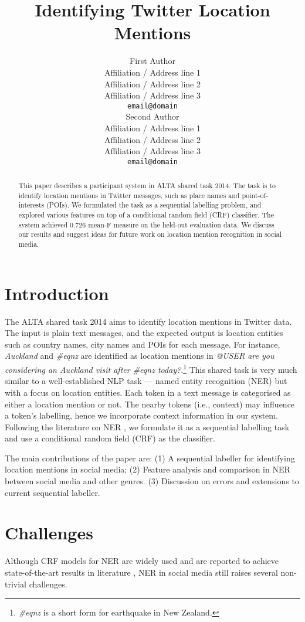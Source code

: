 \documentclass[11pt]{article}
\title{Identifying Twitter Location Mentions}
\author{First Author \\
  Affiliation / Address line 1 \\
  Affiliation / Address line 2 \\
  Affiliation / Address line 3 \\
  {\tt email@domain} \\\And
  Second Author \\
  Affiliation / Address line 1 \\
  Affiliation / Address line 2 \\
  Affiliation / Address line 3 \\
  {\tt email@domain} \\}
\date{}
\newcommand{\ie}{i.e.,\xspace}
\newcommand{\myex}[1]{\textit{#1}}
\begin{document}
\maketitle
\begin{abstract}
    This paper describes a participant system in ALTA shared task 2014.
    The task is to identify location mentions in Twitter messages, such as place names and point-of-interests (POIs).
    We formulated the task as a sequential labelling problem, and explored various features on top of a conditional random field (CRF) classifier.
    The system achieved 0.726 mean-F measure on the held-out evaluation data.
    We discuss our results and suggest ideas for future work on location mention recognition in social media.
\end{abstract}

\section{Introduction}
\label{sec:intro}
The ALTA shared task 2014 aims to identify location mentions in Twitter data.
The input is plain text messages, and the expected output is location entities such as country names, city names and POIs for each message.
For instance, \myex{Auckland} and \myex{\#eqnz} are identified as location mentions in \myex{@USER are you considering an Auckland visit after \#eqnz today?}.\footnote{\myex{\#eqnz} is a short form for earthquake in New Zealand.}
This shared task is very much similar to a well-established NLP task --- named entity recognition (NER) but with a focus on location entities.
Each token in a text message is categorised as either a location mention or not.
The nearby tokens (\ie context) may influence a token's labelling, hence we incorporate context information in our system.
Following the literature on NER \cite{wwwc13ling}, we formulate it as a sequential labelling task and use a conditional random field (CRF) as the classifier.

The main contributions of the paper are:
(1) A sequential labeller for identifying location mentions in social media;
(2) Feature analysis and comparison in NER between social media and other genres.
(3) Discussion on errors and extensions to current sequential labeller.

\section{Challenges}
\label{sec:challenge}
Although CRF models for NER are widely used and are reported to achieve state-of-the-art results in literature \cite{acl05fink,acl11liux,emnlp11ritt}, NER in social media still raises several non-trivial challenges.
\end{document}
